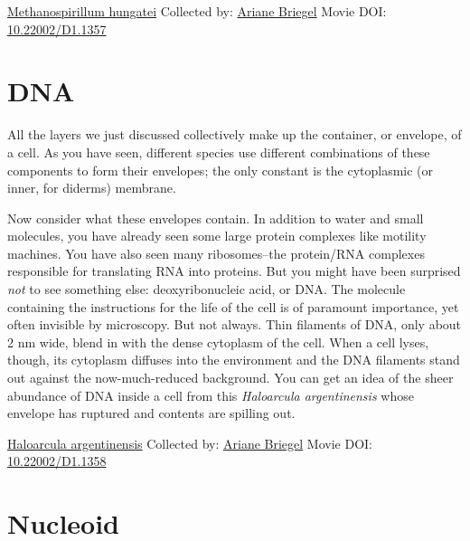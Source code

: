 \documentclass[]{tufte-book}
\begin{document}
\hypertarget{htmlwidget-c9584aa7b4b3d153ba4c}{}

\label{fig:2-8}\protect\hyperlink{tree}{Methanospirillum hungatei} Collected by: \protect\hyperlink{ariane_briegel}{Ariane Briegel} Movie DOI: \href{https://doi.org/10.22002/D1.1357}{10.22002/D1.1357}

\hypertarget{dna}{%
\section{DNA}\label{dna}}

All the layers we just discussed collectively make up the container, or envelope, of a cell. As you have seen, different species use different combinations of these components to form their envelopes; the only constant is the cytoplasmic (or inner, for diderms) membrane.

Now consider what these envelopes contain. In addition to water and small molecules, you have already seen some large protein complexes like motility machines. You have also seen many ribosomes--the protein/RNA complexes responsible for translating RNA into proteins. But you might have been surprised \emph{not} to see something else: deoxyribonucleic acid, or DNA. The molecule containing the instructions for the life of the cell is of paramount importance, yet often invisible by microscopy. But not always. Thin filaments of DNA, only about 2 nm wide, blend in with the dense cytoplasm of the cell. When a cell lyses, though, its cytoplasm diffuses into the environment and the DNA filaments stand out against the now-much-reduced background. You can get an idea of the sheer abundance of DNA inside a cell from this \emph{Haloarcula argentinensis} whose envelope has ruptured and contents are spilling out.



\hypertarget{htmlwidget-ac30a2e65dc849e6ef33}{}

\label{fig:2-9}\protect\hyperlink{tree}{Haloarcula argentinensis} Collected by: \protect\hyperlink{ariane_briegel}{Ariane Briegel} Movie DOI: \href{https://doi.org/10.22002/D1.1358}{10.22002/D1.1358}

\hypertarget{nucleoid}{%
\section{Nucleoid}\label{nucleoid}}
\end{document}
